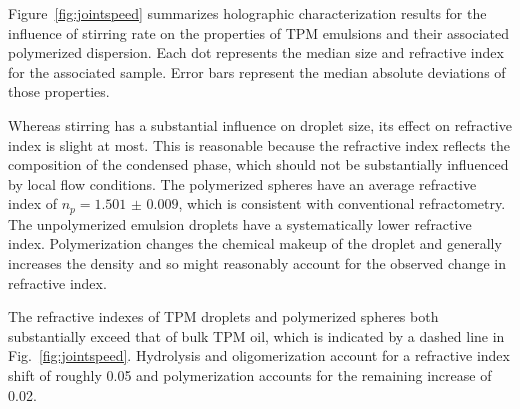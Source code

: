 \documentclass[journal=langd5,manuscript=article,layout=twocolumn]{achemso}
\begin{document}
Figure~\ref{fig:jointspeed} summarizes holographic characterization
results for the influence of stirring rate on the properties of TPM
emulsions and their associated polymerized dispersion.
Each dot represents the median size and refractive index for the associated sample.
Error bars represent the median absolute deviations of those properties.

Whereas stirring has a substantial influence on droplet size,
its effect on refractive index is slight at most.
This is reasonable because the refractive index reflects
the composition of the condensed phase, which should not
be substantially influenced by local flow conditions.
The polymerized spheres have an average refractive index of
$n_p = \num{1.501(9)}$, which is consistent with conventional
refractometry.
The unpolymerized emulsion droplets have a systematically 
lower refractive index.
Polymerization changes the chemical makeup of the droplet and generally increases the
density %
and so might reasonably account for the observed change in refractive index.

The refractive indexes of TPM droplets and polymerized spheres both
substantially exceed that of bulk TPM oil, which is indicated by
a dashed line in Fig.~\ref{fig:jointspeed}.
Hydrolysis and oligomerization account for a refractive
index shift of roughly \num{0.05} and polymerization accounts for the remaining
increase of \num{0.02}.



\end{document}
